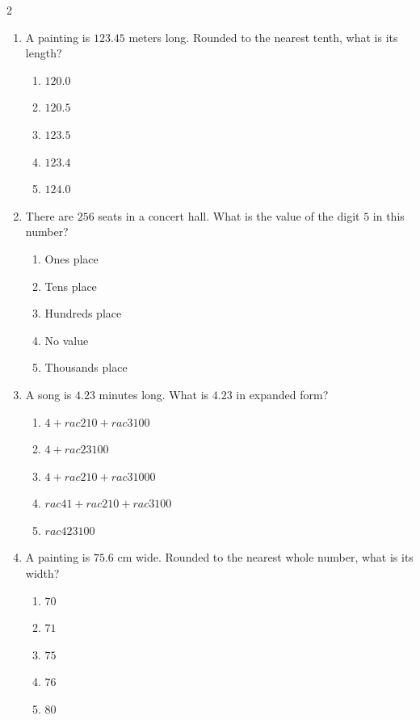 \documentclass[10pt]{article}
\begin{document}
\begin{multicols}{2}
\begin{enumerate}[label=\textbf{Q\arabic*.}, leftmargin=*, itemsep=6pt, parsep=0pt]
  \item \small A painting is $123.45$ meters long. Rounded to the nearest tenth, what is its length?
  \begin{enumerate}[label=(\Alph*), leftmargin=0.6cm, nosep, itemsep=2pt]
    \item $120.0$
    \item $120.5$
    \item $123.5$
    \item $123.4$
    \item $124.0$
  \end{enumerate}

  \item \small There are $256$ seats in a concert hall. What is the value of the digit $5$ in this number?
  \begin{enumerate}[label=(\Alph*), leftmargin=0.6cm, nosep, itemsep=2pt]
    \item Ones place
    \item Tens place
    \item Hundreds place
    \item No value
    \item Thousands place
  \end{enumerate}

  \item \small A song is $4.23$ minutes long. What is $4.23$ in expanded form?
  \begin{enumerate}[label=(\Alph*), leftmargin=0.6cm, nosep, itemsep=2pt]
    \item $4 + rac{2}{10} + rac{3}{100}$
    \item $4 + rac{23}{100}$
    \item $4 + rac{2}{10} + rac{3}{1000}$
    \item $rac{4}{1} + rac{2}{10} + rac{3}{100}$
    \item $rac{423}{100}$
  \end{enumerate}

  \item \small A painting is $75.6$ cm wide. Rounded to the nearest whole number, what is its width?
  \begin{enumerate}[label=(\Alph*), leftmargin=0.6cm, nosep, itemsep=2pt]
    \item $70$
    \item $71$
    \item $75$
    \item $76$
    \item $80$
  \end{enumerate}


\end{enumerate}
\end{multicols}
\end{document}
